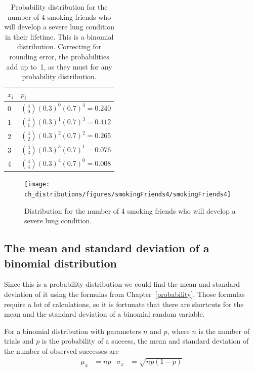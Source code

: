 \begin{table}[h]
\centering
\begin{tabular}{l l}
$x_i$ & $p_i$ \\
\hline
0 &  ${4\choose 0}(0.3)^0(0.7)^{4} = 0.240$ \vspace{1mm}\\
1 &  ${4\choose 1}(0.3)^1(0.7)^{3} = 0.412$  \vspace{1mm}\\
2 & ${4\choose 2}(0.3)^2(0.7)^{2} = 0.265$  \vspace{1mm}\\
3 & ${4\choose 3}(0.3)^3(0.7)^{1} = 0.076$  \vspace{1mm}\\
4 & ${4\choose 4}(0.3)^4(0.7)^{0} = 0.008$  \vspace{1mm}\\
\hline
\end{tabular}
\caption{Probability distribution for the number of 4 smoking friends who will develop a severe lung condition in their lifetime. This is a binomial distribution. Correcting for rounding error, the probabilities add up to~1, as they must for any probability distribution.}
\label{binomDistrSmokers}
\end{table}

\begin{figure}[h]
\centering
\texttt{[image: ch\_distributions/figures/smokingFriends4/smokingFriends4]}
\caption{Distribution for the number of 4 smoking friends who will develop a severe lung condition.}
\label{smokingFriends4}
\end{figure}


\textA{\newpage}

\subsection{The mean and standard deviation of a binomial distribution}

Since this is a probability distribution we could find the mean and standard deviation of it using the formulas from Chapter~\ref{probability}. Those formulas require a lot of calculations, so it is fortunate that there are shortcuts for the mean and the standard deviation of a binomial random variable.

\begin{termBox}{
For a binomial distribution with parameters $n$ and $p$, where $n$ is the number of trials and $p$ is the probability of a success, the mean and standard deviation of the number of observed successes are\vspace{-2mm}
\begin{align}
\mu_x &= np
	&\sigma_x &= \sqrt{np(1-p)}
\label{binomialStats}
\end{align}
}
\end{termBox}

